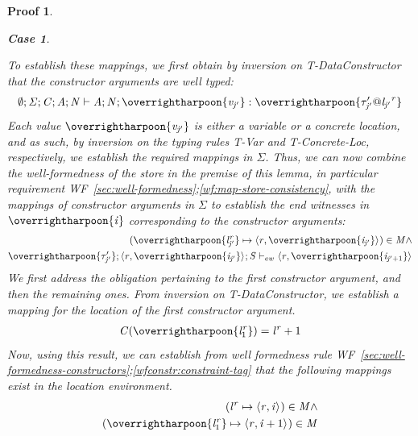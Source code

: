 \documentclass[showabstract,showacknowledgments,showpreface,showdedication,school]{iuphd}
\makeatletter
\newtheorem*{bcase}{Case}
\theoremstyle{nonumberplain}
\newtheorem{nproof}{Proof}
\newcommand{\keywd}[1]{\mathit{#1}}
\newcommand{\skeywd}[1]{\mathit{#1}}
\newcommand{\TYP}{\keywd{\tau}}
\newcommand{\loc}{\skeywd{l}}
\newcommand{\concreteloc}[3]{\ensuremath{\langle #1, #2 \rangle ^{#3}}}
\newcommand{\reg}{\skeywd{r}}
\newcommand{\ind}{\keywd{i}}
\newcommand{\indj}{\keywd{j}}
\newcommand{\VAL}{\keywd{v}}
\newcommand{\STOR}{\keywd{S}}
\newcommand{\CENV}{\keywd{C}}
\newcommand{\SENV}{\keywd{\Sigma}}
\newcommand{\MENV}{\keywd{M}}
\newcommand{\AENV}{\keywd{A}}
\newcommand{\NENV}{\keywd{N}}
\newcommand{\locreg}[2]{\ensuremath{{#1}^{#2}}}
\newcommand{\tyatlocreg}[3]{#1 \ensuremath{@} \locreg{#2}{#3}}
\newcommand{\ewitness}[4]{\ensuremath{#1;#2;#3 \vdash_{ew} #4}}
\newcommand{\refwellformed}[2]{WF~\ref{#1};\ref{#2}}
\newcommand{\tdatacon}{T-DataConstructor}
\newcommand{\tvar}{T-Var}
\newcommand{\tconcreteloc}{T-Concrete-Loc}
\newcommand{\emptytenv}{\emptyset}
\newcommand{\overharpoon}[1]{\overrightharpoon{#1}}
\makeatother
\begin{document}
\begin{nproof}
\begin{bcase}
\begin{itemize}
\begin{itemize}
\begin{itemize}
           To establish these mappings, we first
           obtain by inversion on \tdatacon{} that the
           constructor arguments are well typed:
           \begin{align*}
           \emptytenv;\SENV;\CENV;\AENV;\NENV \vdash \AENV;\NENV;\overharpoon{\VAL_{\indj'}} : \overharpoon{\tyatlocreg{\TYP_{\indj'}'}{\loc_{\indj'}}{\reg}}
           \end{align*}
           Each value $\overharpoon{\VAL_{\indj'}}$ is either a variable or a concrete location, and
           as such, by inversion on the typing rules \tvar{} and \tconcreteloc{}, respectively,
           we establish the required mappings in $\SENV$.
           Thus, we can now combine the well-formedness
           of the store in the premise of this lemma,
           in particular requirement \refwellformed{sec:well-formedness}{wf:map-store-consistency},
           with the mappings of constructor arguments in $\SENV$ to establish
           the end witnesses in $\overharpoon{\ind}$ corresponding to the constructor arguments:
           \begin{align}
           (\overharpoon{\locreg{\loc}{\reg}_{\indj'}} \mapsto \concreteloc{\reg}{\overharpoon{\ind_{\indj'}}}{}) \in \MENV \wedge \label{prf:dc-ew1} \\
           \ewitness{\overharpoon{\TYP_{\indj'}'}}{\concreteloc{\reg}{\overharpoon{\ind_{\indj'}}}{}}{\STOR}{\concreteloc{\reg}{\overharpoon{\ind_{\indj' + 1}}}{}} \label{prf:dc-ew2}
           \end{align}
           We first address the obligation pertaining to the first constructor argument,
           and then the remaining ones.
           From inversion on \tdatacon{}, we establish a mapping for the location of the
           first constructor argument.
           \begin{align*}
           \CENV(\overharpoon{\locreg{\loc}{\reg}_1}) = \locreg{\loc}{\reg} + 1
           \end{align*}
           Now, using this result, we can establish from well
           formedness rule \refwellformed{sec:well-formedness-constructors}{wfconstr:constraint-tag}
           that the following mappings exist in the location environment.
           \begin{align*}
           (\locreg{\loc}{\reg} \mapsto \concreteloc{\reg}{\ind}{})  \in \MENV \wedge \\
                      (\overharpoon{\locreg{\loc}{\reg}_1} \mapsto \concreteloc{\reg}{\ind + 1}{})  \in \MENV
           \end{align*}

\end{itemize}
\end{itemize}
\end{itemize}
\end{bcase}
\end{nproof}
\end{document}
